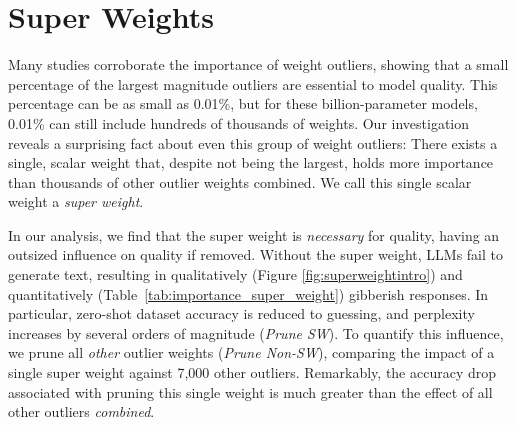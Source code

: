\documentclass{article} %
\begin{document}
\section{Super Weights}
\label{sec:superweights}


Many studies corroborate the importance of weight outliers, showing that a small percentage of the largest magnitude outliers are essential to model quality. This percentage can be as small as 0.01\%, but for these billion-parameter models, 0.01\% can still include hundreds of thousands of weights. Our investigation reveals a surprising fact about even this group of weight outliers: There exists a single, scalar weight that, despite not being the largest, holds more importance than thousands of other outlier weights combined. We call this single scalar weight a \textit{super weight}.

In our analysis, we find that the super weight is \textit{necessary} for quality, having an outsized influence on quality if removed. Without the super weight, LLMs fail to generate text, resulting in qualitatively (Figure \ref{fig:superweightintro}) and quantitatively (Table~\ref{tab:importance_super_weight}) gibberish responses. In particular, zero-shot dataset accuracy is reduced to guessing, and perplexity increases by several orders of magnitude (\textit{Prune SW}). To quantify this influence, we prune all \textit{other} outlier weights (\textit{Prune Non-SW}), comparing the impact of a single super weight against 7,000 other outliers. Remarkably, the accuracy drop associated with pruning this single weight is much greater than the effect of all other outliers \emph{combined}.
\end{document}

